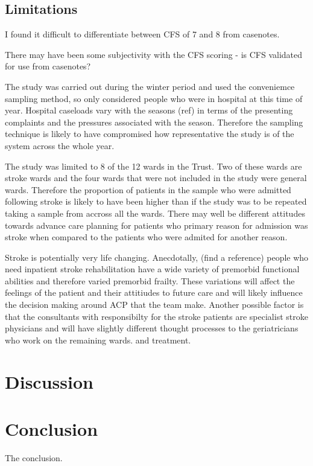 \documentclass
[
	12pt,
	a4paper,
	oneside,
]{report}
\begin{document}


\section{Limitations}
I found it difficult to differentiate between CFS of 7 and 8 from casenotes.

There may have been some subjectivity with the CFS scoring - is CFS validated 
for use from casenotes?

The study was carried out during the winter period and used the conveniemce
sampling method, so only considered people who were in hospital at this time 
of year. Hospital caseloads vary with the seasons (ref) in terms of the 
presenting complaints and the pressures associated with the season. Therefore
the sampling technique is likely to have compromised how representative the
study is of the system across the whole year.

The study was limited to 8 of the 12 wards in the Trust. Two of these wards
are stroke wards and the four wards that were not included in the study were 
general wards. Therefore the proportion of patients in the sample
who were admitted following stroke is likely to have been higher than if the 
study was to be repeated taking a sample from accross all the wards. There may 
well be different attitudes towards advance care planning for patients who 
primary reason for admission was stroke when compared to the patients who
were admited for another reason.

Stroke is potentially very life changing. Anecdotally, (find a reference) 
people who need
inpatient stroke rehabilitation have a wide variety of premorbid functional 
abilities and therefore varied premorbid frailty. These variations will
affect the feelings of the patient and their attitiudes to future care and will
likely influence the decision making around ACP that the team make. Another
possible factor is that the consultants with responsibilty for the stroke 
patients are specialist stroke physicians and will have slightly different 
thought processes to the geriatricians who work on the remaining wards.
and treatment.

\chapter{Discussion}

\chapter{Conclusion}
The conclusion.
\end{document}

